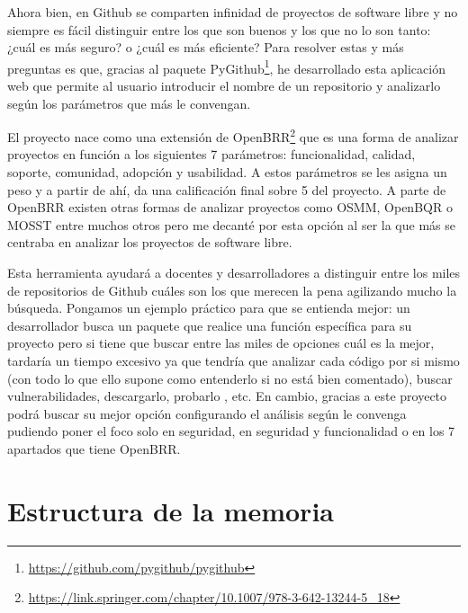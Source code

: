 \documentclass[a4paper, 12pt]{book}
\begin{document}
Ahora bien, en Github se comparten infinidad de proyectos de software libre y no siempre es fácil distinguir entre los que son buenos y los que no lo son tanto: ¿cuál es más seguro? o ¿cuál es más eficiente?
Para resolver estas y más preguntas es que, gracias al paquete PyGithub\footnote{\url{https://github.com/pygithub/pygithub}}, he desarrollado esta aplicación web que permite al usuario introducir el nombre de un repositorio y analizarlo según los parámetros que más
le convengan.

El proyecto\cite{website:RepositorioTFG}  nace como una extensión de OpenBRR\footnote{\url{https://link.springer.com/chapter/10.1007/978-3-642-13244-5_18}} que es una forma de analizar proyectos en función a los siguientes 7 parámetros: funcionalidad, calidad, soporte, comunidad, adopción y usabilidad.
A estos parámetros se les asigna un peso y a partir de ahí, da una calificación final sobre 5 del proyecto. A parte de OpenBRR existen otras formas de analizar proyectos como OSMM, OpenBQR o MOSST entre muchos otros pero me decanté por esta opción al ser la que más se 
centraba en analizar los proyectos de software libre.

Esta herramienta ayudará a docentes y desarrolladores a distinguir entre los miles de repositorios de Github cuáles son los que merecen la pena agilizando mucho la búsqueda. Pongamos un ejemplo práctico para que se entienda mejor: un desarrollador busca un paquete
que realice una función específica para su proyecto pero si tiene que buscar entre las miles de opciones cuál es la mejor, tardaría un tiempo excesivo ya que tendría que analizar cada código por si mismo (con todo lo que ello supone como entenderlo si no está bien comentado),
buscar vulnerabilidades, descargarlo, probarlo , etc. En cambio, gracias a este proyecto podrá buscar su mejor opción configurando el análisis según le convenga pudiendo poner el foco solo en seguridad, en seguridad y funcionalidad o en los 7 apartados que tiene OpenBRR.


\section{Estructura de la memoria}
\label{sec:estructura}
\end{document}
